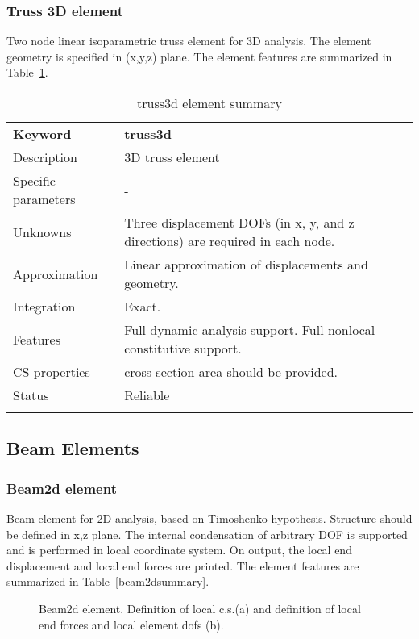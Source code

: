 \documentclass[a4paper]{article}
\newcommand{\templabel}{}%
\newcommand{\tempcaption}{}%
\newcounter{nelpar}
\newenvironment{elementsummary}[5]{%
  \gdef\tempcaption{#4}%
  \gdef\templabel{#5}%
  \setcounter{nelpar}{0}%
  \begin{center} %
    \begin{table}[!htb] %
      \begin{tabular}{|l|p{9cm}|}\hline %
        {\bf Keyword} & \bf{#1}\\ %
        {Description} & {#2}\\ %
        {Specific parameters} & {#3}\\ \hline %
}{%
  \\ \hline %
      \end{tabular}%
      \caption{\tempcaption}%
      \label{\templabel}%
    \end{table}%
  \end{center}%
}
\newcommand{\elementDescription}[2]{{#1} & {#2}\\ }
\begin{document}
\subsubsection{Truss 3D element}
\label{Truss3d}

Two node linear isoparametric truss element for 3D analysis. The
element geometry is specified in (x,y,z) plane.  The element features are summarized in Table~\ref{truss3dsummary}.


\begin{elementsummary}{truss3d}{3D truss element}{-}{truss3d element summary}{truss3dsummary}
\elementDescription{Unknowns}{Three displacement DOFs (in x, y, and z directions) are required
in each node.}
\elementDescription{Approximation}{Linear approximation of displacements and geometry.}
\elementDescription{Integration}{Exact.}
\elementDescription{Features}{Full dynamic analysis support. Full nonlocal
constitutive support.}
\elementDescription{CS properties}{cross section area should be
provided.}
\elementDescription{Status}{Reliable}
\end{elementsummary}



\clearpage
\subsection{Beam Elements}
\subsubsection{Beam2d element}
Beam element for 2D analysis, based on Timoshenko hypothesis. Structure should be defined in x,z
plane. The internal condensation
of arbitrary DOF is supported and is performed in local coordinate
system. On output, the local end displacement and local end forces are
printed. The element features are summarized in Table~\ref{beam2dsummary}.

\begin{figure}[htb]
 \centering
 \begin{makeimage}
   
 \end{makeimage}
 \caption{Beam2d element. Definition of local c.s.(a)  and definition of
 local end forces and local element dofs (b).}
 \label{beam2dfig}
\end{figure}
\end{document}
